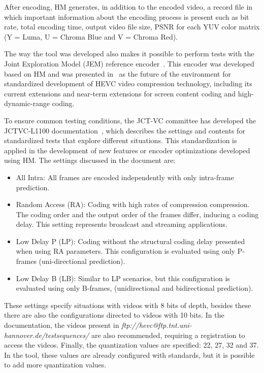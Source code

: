 \documentclass{acm_proc_article-sp}
\begin{document}
After encoding, HM generates, in addition to the encoded video, a record file in which important information about the encoding process is present such as bit rate, total encoding time, output video file size, PSNR for each YUV color matrix (Y = Luma, U = Chroma Blue and V = Chroma Red).


The way the tool was developed also makes it possible to perform tests with the Joint Exploration Model (JEM) reference encoder~\cite{Bossen:17}. This encoder was developed based on HM and was presented in~\cite{JVET:2015} as the future of the environment for standardized development of HEVC video compression technology, including its current extensions and near-term extensions for screen content coding and high-dynamic-range coding.



To ensure common testing conditions, the JCT-VC committee has developed the JCTVC-L1100 documentation~\cite{Bossen:13}, which describes the settings and contents for standardized tests that explore different situations. This standardization is applied in the development of new features or encoder optimizations developed using HM. The settings discussed in the document are:

\begin{itemize}

  \item All Intra: All frames are encoded independently with only intra-frame prediction.
  \item Random Access (RA): Coding with high rates of compression compression. The coding order and the output order of the frames differ, inducing a coding delay. This setting represents broadcast and streaming applications.
  \item Low Delay P (LP): Coding without the structural coding delay presented when using RA parameters. This configuration is evaluated using only P-frames (uni-directional prediction).
  \item Low Delay B (LB): Similar to LP scenarios, but this configuration is evaluated using only B-frames, (unidirectional and bidirectional prediction).

\end{itemize}

These settings specify situations with videos with 8 bits of depth, besides these there are also the configurations directed to videos with 10 bits. In the documentation, the videos present in \emph{ftp://hevc@ftp.tnt.uni-hannover.de/testsequences/} are also recommended, requiring a registration to access the videos. Finally, the quantization values are specified: 22, 27, 32 and 37. In the tool, these values are already configured with standards, but it is possible to add more quantization values.
\end{document}
